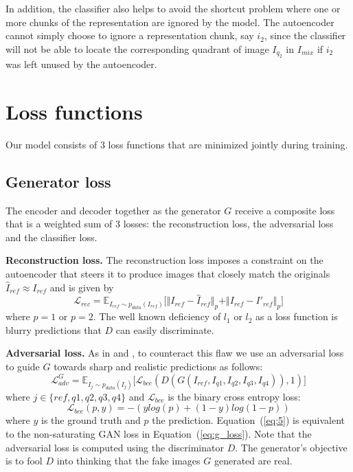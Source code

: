 \documentclass[a4paper,12pt]{report}
\begin{document}
In addition, the classifier also helps to avoid the shortcut problem \cite{ChallengInDisentIFoF} where one or more chunks of the representation are ignored by the model. The autoencoder cannot simply choose to ignore a representation chunk, say $i_2$, since the classifier will not be able to locate the corresponding quadrant of image $I_{q_2}$ in $I_{mix}$ if $i_2$ was left unused by the autoencoder.


\section{Loss functions}
Our model consists of 3 loss functions that are minimized jointly during training.

\subsection{Generator loss}
The encoder and decoder together as the generator $G$ receive a composite loss that is a weighted sum of 3 losses: the reconstruction loss, the adversarial loss and the classifier loss. 

\textbf{Reconstruction loss.} The reconstruction loss imposes a constraint on the autoencoder that steers it to produce images that closely match the originals $\hat{I}_{ref} \approx I_{ref}$ and is given by
\begin{equation} \label{eq:4}
    \mathcal{L}_{rec} = \mathbb{E}_{I_{ref}\sim p_{data} (I_{ref})}\big[ \Vert I_{ref} - \hat{I}_{ref} \Vert_p + \Vert I_{ref} - I'_{ref} \Vert_p \big]
\end{equation}
where $p = 1$ or $p = 2$. The well known deficiency of $l_1$ or $l_2$ as a loss function is blurry predictions that $D$ can easily discriminate.

\textbf{Adversarial loss.} As in \cite{DisentFacOfVarByMixTh} and \cite{1511.05440}, to counteract this flaw we use an adversarial loss to guide $G$ towards sharp and realistic predictions as follows:
\begin{equation} \label{eq:5}
    \mathcal{L}^G_{adv} = \mathbb{E}_{I_{j}\sim p_{data} (I_{j})}\big[ \mathcal{L}_{bce}(D(G(I_{ref},I_{q1},I_{q2},I_{q3},I_{q4})), 1)\big]
\end{equation}
where $j \in \{ref,q1,q2,q3,q4\}$ and $\mathcal{L}_{bce}$ is the binary cross entropy loss:
\begin{equation} \label{eq:6}
    \mathcal{L}_{bce}(p, y) = -(ylog(p) + (1 - y)log(1-p))
\end{equation}
where $y$ is the ground truth and $p$ the prediction. Equation~(\ref{eq:5}) is equivalent to the non-saturating GAN loss in Equation~(\ref{eq:g_loss}). Note that the adversarial loss is computed using the discriminator $D$. The generator's objective is to fool $D$ into thinking that the fake images $G$ generated are real.
\end{document}
